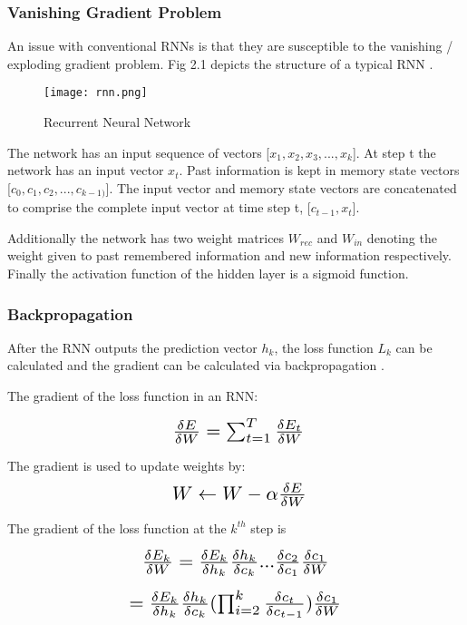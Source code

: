 \subsubsection{Vanishing Gradient Problem}
An issue with conventional RNNs is that they are susceptible to the vanishing / exploding gradient problem. Fig 2.1 depicts the structure of a typical RNN \cite{nirarbel}.

\begin{figure}[h]
\centering
\texttt{[image: rnn.png]}
\caption{Recurrent Neural Network}
\end{figure}

The network has an input sequence of vectors [$x_1, x_2, x_3, ..., x_k$]. At step t the network has an input vector $x_t$. Past information is kept in memory state vectors [$c_0, c_1, c_2, ..., c_{k-1)}$]. The input vector and memory state vectors are concatenated to comprise the complete input vector at time step t, [$c_{t-1}, x_t$].

Additionally the network has two weight matrices $W_{rec}$ and $W_{in}$ denoting the weight given to past remembered information and new information respectively. Finally the activation function of the hidden layer is a sigmoid function.

\subsubsection{Backpropagation}
After the RNN outputs the prediction vector $h_k$, the loss function $L_k$ can be calculated and the gradient can be calculated via backpropagation \cite{barakor}.

The gradient of the loss function in an RNN:

\[ \scalebox{1.5}{ $\frac{\delta{E}}{\delta {W}} = \sum_{t=1}^{T} \frac{\delta{E_t}}{\delta {W}}$} \]

The gradient is used to update weights by:
\[ \scalebox{1.5}{  $W \leftarrow W - \alpha \frac{\delta{E}}{\delta {W}} $} \]

The gradient of the loss function at the $k^{th}$ step is

\[ \scalebox{1.5}{$\frac{\delta{E_k}}{\delta {W}} = \frac{\delta{E_k}}{\delta {h_k}} \frac{\delta{h_k}}{\delta {c_k}} ... \frac{\delta{c_2}}{\delta {c_1}} \frac{\delta{c_1}}{\delta {W}} $} \]

\[ \scalebox{1.5}{$= \frac{\delta{E_k}}{\delta {h_k}} \frac{\delta{h_k}}{\delta {c_k}} (\prod_{i=2}^{k} \frac{\delta{c_t}}{\delta {c_{t-1}}} ) \frac{\delta{c_1}}{\delta {W}}$} \] 



